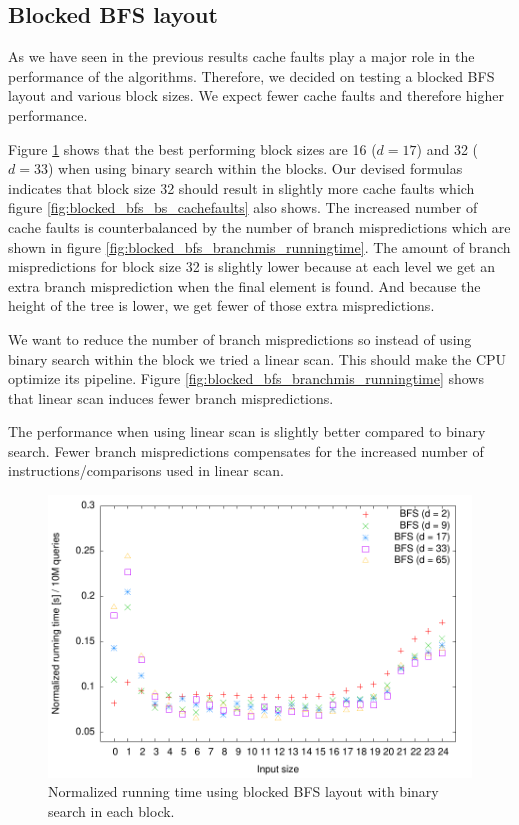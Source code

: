 \subsection{Blocked BFS layout}

As we have seen in the previous results cache faults play a major role in the performance of the algorithms. Therefore, we decided on testing a blocked BFS layout and various block sizes. We expect fewer cache faults and therefore higher performance.

Figure \ref{fig:blocked_bfs_bs_runningtime} shows that the best performing block sizes are 16 ($d = 17$) and 32 ($d = 33$) when using binary search within the blocks. Our devised formulas indicates that block size 32 should result in slightly more cache faults which figure \ref{fig:blocked_bfs_bs_cachefaults} also shows. The increased number of cache faults is counterbalanced by the number of branch mispredictions which are shown in figure \ref{fig:blocked_bfs_branchmis_runningtime}. The amount of branch mispredictions for block size 32 is slightly lower because at each level we get an extra branch misprediction when the final element is found. And because the height of the tree is lower, we get fewer of those extra mispredictions.

We want to reduce the number of branch mispredictions so instead of using binary search within the block we tried a linear scan. This should make the CPU optimize its pipeline. Figure \ref{fig:blocked_bfs_branchmis_runningtime} shows that linear scan induces fewer branch mispredictions.

The performance when using linear scan is slightly better compared to binary search. Fewer branch mispredictions compensates for the increased number of instructions/comparisons used in linear scan.


\begin{figure}[h!]
  \centering
  \includegraphics[width=\textwidth]{../week1/plots/outputs/Btree_bs_runningtime}
  \caption{Normalized running time using blocked BFS layout with binary search in each block.}
  \label{fig:blocked_bfs_bs_runningtime}
\end{figure}

